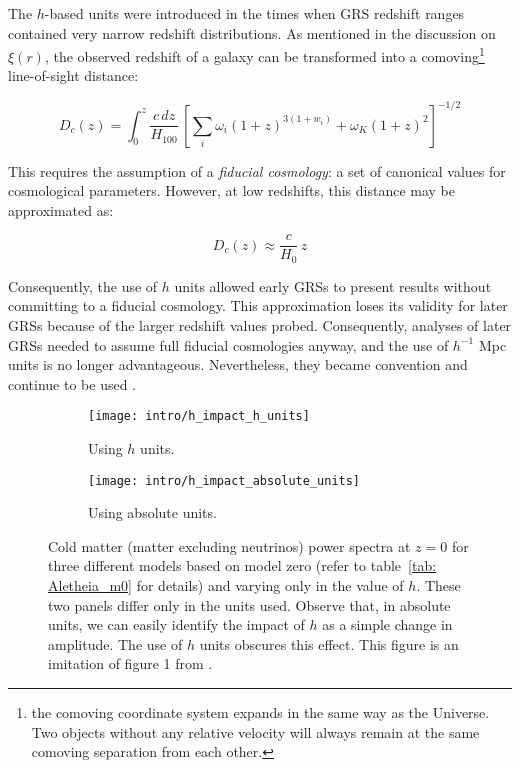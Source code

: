 The $h$-based units were introduced in the times when GRS redshift 
ranges contained very narrow redshift distributions. As mentioned in the
discussion on $\xi(r)$, the observed redshift of a galaxy can be transformed
into a comoving\footnote{the comoving coordinate system expands in the same
way as the Universe. Two objects without any relative velocity will always
remain at the same comoving separation from each other.} line-of-sight 
distance:

\begin{equation}
D_c (z)
=
\int_0^z \frac{c \, dz}{H_{100}}
\,
\left[
	\sum_i \omega_i (1 + z)^{3(1 + w_i)}
	+
	\omega_K (1 + z)^2
\right]^{-1/2}
\end{equation}

This requires the assumption of a \textit{fiducial cosmology}: a set of 
canonical values for cosmological parameters. However, at low
redshifts, this distance may be approximated as:

\begin{equation}
\label{eq: comov_dist_approx}
D_c(z) \approx \frac{c}{H_0} \, z
\end{equation}

Consequently, the use of $h$ units allowed early GRSs to present results
without committing to a fiducial cosmology. This
approximation loses its validity for later GRSs because of the larger redshift
values probed. Consequently, analyses of later GRSs needed to assume full 
fiducial cosmologies anyway, and the use of $h^{-1}$ Mpc units is no longer
advantageous. Nevertheless, they became convention and continue to be used 
.

\begin{figure}[ht!]
    \begin{subfigure}{0.45 \textwidth}
    \centering
 		\texttt{[image: intro/h\_impact\_h\_units]}
 		\caption{Using $h$ units.}
 		\label{fig: h_units}
    \end{subfigure}
    \begin{subfigure}{0.45 \textwidth}
    \centering
 		\texttt{[image: intro/h\_impact\_absolute\_units]}
 		\caption{Using absolute units.}
 		\label{fig: without_h_units}
    \end{subfigure}
        \centering
    \caption[Impact of $h$ on $P(k)$]
    		{Cold matter (matter excluding neutrinos) power spectra at $z=0$ for 
    		three different
    		models based on model zero (refer to table~\ref{tab: Aletheia_m0} 
    		for details) and varying only in the value of $h$. These two
    		panels
    		differ only in the units used. Observe that, in absolute units, we
    		can easily identify the impact of $h$ as a simple change in
    		amplitude. The use of $h$ units obscures this effect. This figure 
    		is an imitation of figure 1 from \citet{San20}.}
    \label{fig: h_unit_Pk}
\end{figure}

